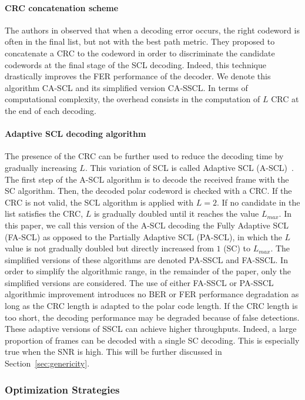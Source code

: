 \paragraph{CRC concatenation scheme}

The authors in \cite{Tal2011} observed that when a decoding error occurs, the
right codeword is often in the final list, but not with the best path metric.
They proposed to concatenate a CRC to the codeword in order to discriminate the
candidate codewords at the final stage of the SCL decoding. Indeed, this
technique drastically improves the FER performance of the decoder. We denote
this algorithm CA-SCL and its simplified version CA-SSCL. In terms of
computational complexity, the overhead consists in the computation of $L$ CRC at
the end of each decoding.

\paragraph{Adaptive SCL decoding algorithm}

The presence of the CRC can be further used to reduce the decoding time by
gradually increasing $L$. This variation of SCL is called Adaptive SCL
(A-SCL)~\cite{Li2012}. The first step of the A-SCL algorithm is to decode the
received frame with the SC algorithm. Then, the decoded polar codeword is
checked with a CRC. If the CRC is not valid, the SCL algorithm is applied with
$L=2$. If no candidate in the list satisfies the CRC, $L$ is gradually doubled
until it reaches the value $L_{max}$. In this paper, we call this version of the
A-SCL decoding the Fully Adaptive SCL (FA-SCL) as opposed to the Partially
Adaptive SCL (PA-SCL), in which the $L$ value is not gradually doubled but
directly increased from $1$ (SC) to $L_{max}$. The simplified versions of these
algorithms are denoted PA-SSCL and FA-SSCL. In order to simplify the algorithmic
range, in the remainder of the paper, only the simplified versions are
considered. The use of either FA-SSCL or PA-SSCL algorithmic improvement
introduces no BER or FER performance degradation as long as the CRC length is
adapted to the polar code length. If the CRC length is too short, the decoding
performance may be degraded because of false detections. These adaptive versions
of SSCL can achieve higher throughputs. Indeed, a large proportion of frames can
be decoded with a single SC decoding. This is especially true when the SNR is
high. This will be further discussed in Section~\ref{sec:genericity}.

\subsubsection{Optimization Strategies}

